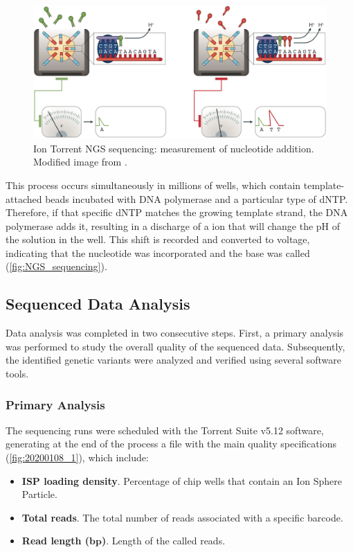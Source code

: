 \begin{figure}[ht]
    \centering
    \includegraphics[width=\textwidth]{Images/chapter_3/NGS_sequencing.png}
    \caption{Ion Torrent\texttrademark{} NGS sequencing: measurement of nucleotide addition. Modified image from \cite{NGS}.}
    \label{fig:NGS_sequencing}
\end{figure}

This process occurs simultaneously in millions of wells, which contain template-attached beads incubated with DNA polymerase and a particular type of dNTP. Therefore, if that specific dNTP matches the growing template strand, the DNA polymerase adds it, resulting in a discharge of a  ion that will change the pH of the solution in the well. This shift is recorded and converted to voltage, indicating that the nucleotide was incorporated and the base was called (\autoref{fig:NGS_sequencing}).

\subsection{Sequenced Data Analysis}

Data analysis was completed in two consecutive steps. First, a primary analysis was performed to study the overall quality of the sequenced data. Subsequently, the identified genetic variants were analyzed and verified using several software tools.

\subsubsection{Primary Analysis}

The sequencing runs were scheduled with the Torrent Suite\texttrademark{} v5.12 software, generating at the end of the process a file with the main quality specifications (\autoref{fig:20200108_1}), which include:
\begin{itemize}
    \item \textbf{ISP loading density}. Percentage of chip wells that contain an Ion Sphere\texttrademark{} Particle.
    \item \textbf{Total reads}. The total number of reads associated with a specific barcode.
    \item \textbf{Read length ($\boldsymbol{bp}$)}. Length of the called reads.
\end{itemize}


